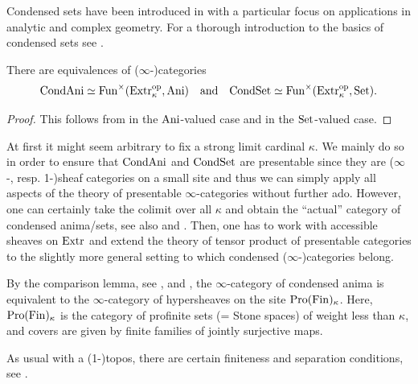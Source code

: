 Condensed sets have been introduced in \cite{Scholze2026,Scholze2026a,Clausen2026}
with a particular focus on applications in analytic and complex geometry.
For a thorough introduction to the basics of condensed sets see \cite{Bihlmaier2025}.

\begin{proposition}\label{prop:cond-sheaves}
There are equivalences of ($\infty$-)categories
\[
    \mathrm{CondAni}\simeq\operatorname{Fun}^\times(\mathrm{Extr}_\kappa^{\mathrm{op}},\mathrm{Ani})\quad\text{and}\quad\mathrm{CondSet}\simeq\operatorname{Fun}^\times(\mathrm{Extr}_\kappa^{\mathrm{op}},\mathrm{Set}).
\]
\end{proposition}

\begin{proof}
This follows from \cite[Proposition 5.5.8.15, Remark 5.5.8.16]{Lurie2009} in the $\mathrm{Ani}$-valued case
and \cite[Corollary 2.8]{Adamek2001} in the $\mathrm{Set}$-valued case.
\end{proof}

\begin{remark}\label{rem:size-issues}
At first it might seem arbitrary to fix a strong limit cardinal $\kappa$.
We mainly do so in order to ensure that $\mathrm{CondAni}$ and $\mathrm{CondSet}$ are presentable
since they are ($\infty$-, resp. 1-)sheaf categories on a small site
and thus we can simply apply all aspects of the theory of presentable $\infty$-categories without further ado.
However, one can certainly take the colimit over all $\kappa$ and obtain the \enquote{actual} category of condensed anima/sets,
see also \cite[Remark 1.4]{Scholze2026} and \cite[Theorem 2.4.2]{Bihlmaier2025}.
Then, one has to work with accessible sheaves on $\mathrm{Extr}$ and extend the theory of tensor product of presentable categories
to the slightly more general setting to which condensed ($\infty$-)categories belong.
\end{remark}

\begin{remark}\label{rem:cond-sheaves-comparison}
By the comparison lemma, see \cite[Theorem 2.3.10]{Bihlmaier2025}, \cite[Appendix, Corollary 4.3]{MacLane1994} and \cite[Remark 4.4.8]{Kuijper2026},
the $\infty$-category of condensed anima is equivalent to the $\infty$-category of hypersheaves on the site $\operatorname{Pro}(\mathrm{Fin})_\kappa$.
Here, $\operatorname{Pro}(\mathrm{Fin})_\kappa$ is the category of profinite sets (= Stone spaces) of weight less than $\kappa$,
and covers are given by finite families of jointly surjective maps.
\end{remark}

As usual with a (1-)topos, there are certain finiteness and separation conditions, see \cite[Chapter 2.5]{Bihlmaier2025}.

